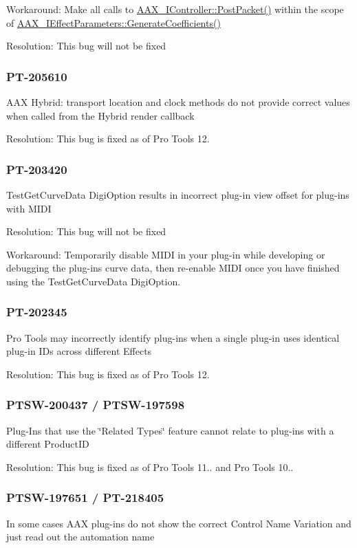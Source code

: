 Workaround\+: Make all calls to \mbox{\hyperlink{a01789_ae5dd2b5925dbc181513bca1c4ac5e716}{A\+A\+X\+\_\+\+I\+Controller\+::\+Post\+Packet()}} within the scope of \mbox{\hyperlink{a01669_a083265b008921b6114ede387711694b7}{A\+A\+X\+\_\+\+I\+Effect\+Parameters\+::\+Generate\+Coefficients()}}

Resolution\+: This bug will not be fixed\hypertarget{a00846_PT-205610}{}\subsubsection{P\+T-\/205610}\label{a00846_PT-205610}
A\+AX Hybrid\+: transport location and clock methods do not provide correct values when called from the Hybrid render callback

Resolution\+: This bug is fixed as of Pro Tools 12.\hypertarget{a00846_PT-203420}{}\subsubsection{P\+T-\/203420}\label{a00846_PT-203420}
{\ttfamily Test\+Get\+Curve\+Data} Digi\+Option results in incorrect plug-\/in view offset for plug-\/ins with M\+I\+DI

Resolution\+: This bug will not be fixed

Workaround\+: Temporarily disable M\+I\+DI in your plug-\/in while developing or debugging the plug-\/in\textquotesingle{}s curve data, then re-\/enable M\+I\+DI once you have finished using the {\ttfamily Test\+Get\+Curve\+Data} Digi\+Option.\hypertarget{a00846_PT-202345}{}\subsubsection{P\+T-\/202345}\label{a00846_PT-202345}
Pro Tools may incorrectly identify plug-\/ins when a single plug-\/in uses identical plug-\/in I\+Ds across different Effects

Resolution\+: This bug is fixed as of Pro Tools 12.\hypertarget{a00846_PTSW-200437}{}\subsubsection{P\+T\+S\+W-\/200437 / P\+T\+S\+W-\/197598}\label{a00846_PTSW-200437}
Plug-\/\+Ins that use the \char`\"{}\+Related Types\char`\"{} feature cannot relate to plug-\/ins with a different Product\+ID

Resolution\+: This bug is fixed as of Pro Tools 11.. and Pro Tools 10..\hypertarget{a00846_PTSW-197651}{}\subsubsection{P\+T\+S\+W-\/197651 / P\+T-\/218405}\label{a00846_PTSW-197651}
In some cases A\+AX plug-\/ins do not show the correct Control Name Variation and just read out the automation name

